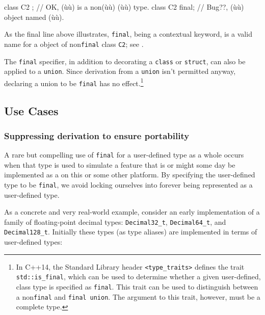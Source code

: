 {{\begin{emcppslisting}
class C2 { };        // OK, (ù{}ù) is a non(ù{}ù) (ù{}ù) type.
class C2 final;      // Bug??, (ù{}ù) object named (ù{}ù).
\end{emcppslisting}
    

\noindent As the final line above illustrates, \lstinline!final!, being a contextual
keyword, is a valid name for a object of non\lstinline!final! class
\lstinline!C2!; see .

\pagebreak%

The \lstinline!final! specifier, in addition to decorating a \lstinline!class!
or \lstinline!struct!, can also be applied to a \lstinline!union!. Since
derivation from a \lstinline!union! isn't permitted anyway, declaring a
union to be \lstinline!final! has no effect.{\cprotect\footnote{In C++14,
the Standard Library header \lstinline!<type_traits>! defines the trait
\lstinline!std::is_final!, which can be used to determine whether a
given user-defined, class type is specified as \lstinline!final!. This
trait can be used to distinguish between a non\lstinline!final! and
\lstinline!final!~\lstinline!union!. The argument to this trait, however,
  must be a complete type.}}

\subsection[Use Cases]{Use Cases}\label{use-cases-final}

\subsubsection[Suppressing derivation to ensure portability]{Suppressing derivation to ensure portability}\label{suppressing-derivation-to-ensure-portability}

A rare but compelling use of \lstinline!final! for a user-defined type as a
whole occurs when that type is used to simulate a feature that is or
might some day be implemented as a  on this or
some other platform. By specifying the user-defined type to be
\lstinline!final!, we avoid locking ourselves into forever being
represented as a user-defined type.

As a concrete and very real-world example, consider an early
implementation of a family of floating-point decimal types:
\lstinline!Decimal32_t!, \lstinline!Decimal64_t!, and
\lstinline!Decimal128_t!. Initially these types (as type aliases) are
implemented in terms of user-defined types:

}}
